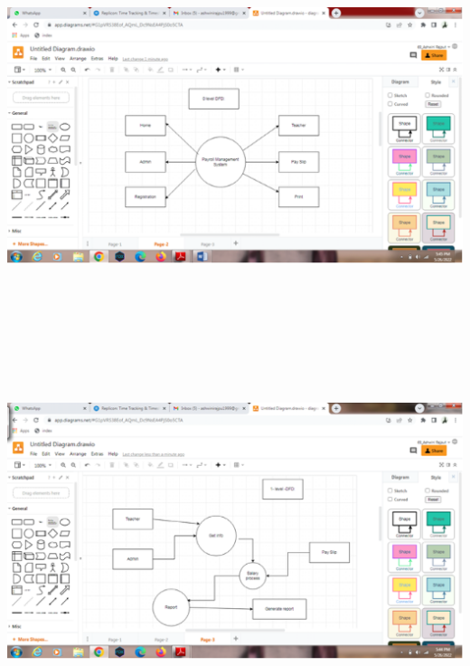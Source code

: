 \documentclass{article} %
\begin{document}
\noindent {}

\noindent \includegraphics*[width=5.95in, height=4.54in, keepaspectratio=false, trim=1.57in 0.78in 1.74in 1.96in]{image6}\underbar{}

\noindent \underbar{}

\noindent {}

\noindent \includegraphics*[width=5.88in, height=4.17in, keepaspectratio=false, trim=1.54in 0.75in 2.12in 1.89in]{image7}\underbar{}
\end{document}
